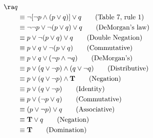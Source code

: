 \begin{questions}
\begin{solution}
    \vspace{-20pt}
    \begin{align*}
        [ \neg p & \wedge (p \vee q) ] \ra q \\
        & \equiv \neg [ \neg p \wedge (p \vee q) ] \vee q \tag{Table 7, rule 1} \\
        & \equiv \neg \neg p \vee \neg (p \vee q) \vee q \tag{DeMorgan's law} \\
        & \equiv p \vee \neg (p \vee q) \vee q \tag{Double Negation} \\
        & \equiv p \vee q \vee \neg (p \vee q) \tag{Commutative} \\
        & \equiv p \vee q \vee (\neg p \wedge \neg q) \tag{DeMorgan's} \\
        & \equiv p \vee (q \vee \neg p) \wedge (q \vee \neg q) \tag{Distributive} \\
        & \equiv p \vee (q \vee \neg p) \wedge \mathbf{T} \tag{Negation} \\
        & \equiv p \vee (q \vee \neg p) \tag{Identity} \\
        & \equiv p \vee (\neg p \vee q) \tag{Commutative} \\
        & \equiv (p \vee \neg p) \vee q \tag{Associative} \\
        & \equiv \mathbf{T} \vee q \tag{Negation} \\
        & \equiv \mathbf{T} \tag{Domination}
    \end{align*}
\end{solution}





\end{questions}
